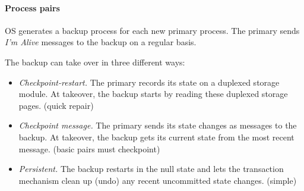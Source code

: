 \paragraph{Process pairs} OS generates a backup process for each new primary process. The primary sends \textit{I'm Alive} messages to the backup on a regular basis.

The backup can take over in three different ways:
\begin{itemize}
  \item \textit{Checkpoint-restart.} The primary records its state on a duplexed storage module. At takeover, the backup starts by reading these duplexed storage pages. (quick repair)
  \item \textit{Checkpoint message.} The primary sends its state changes as messages to the backup. At takeover, the backup gets its current state from the most recent message. (basic pairs must checkpoint)
  \item \textit{Persistent.} The backup restarts in the null state and lets the transaction mechanism clean up (undo) any recent uncommitted state changes. (simple)
\end{itemize}

